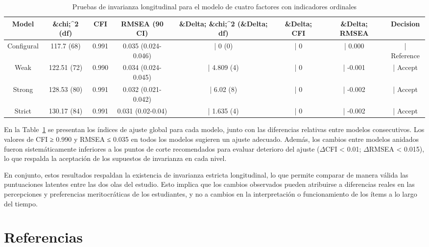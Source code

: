 \documentclass[
  12pt,
]{article}
\begin{document}
\begin{longtable}[t]{cccccccc}

\caption{\label{tbl-invarianza}Pruebas de invarianza longitudinal para
el modelo de cuatro factores con indicadores ordinales}

\tabularnewline

\toprule
Model & \&chi;\textasciicircum{}2 (df) & CFI & RMSEA (90 CI) & \&Delta; \&chi;\textasciicircum{}2 (\&Delta; df) & \&Delta; CFI & \&Delta; RMSEA & Decision\\
\midrule
Configural & 117.7 (68) & 0.991 & 0.035 
 (0.024-0.046) & |            0 (0) & |      0 & |     0.000 & | Reference\\
Weak & 122.51 (72) & 0.990 & 0.034 
 (0.024-0.045) & |          4.809 (4) & |      0 & |    -0.001 & |  Accept\\
Strong & 128.53 (80) & 0.991 & 0.032 
 (0.021-0.042) & |           6.02 (8) & |      0 & |    -0.002 & |  Accept\\
Strict & 130.17 (84) & 0.991 & 0.031 
 (0.02-0.04) & |          1.635 (4) & |      0 & |    -0.002 & |  Accept\\
\bottomrule

\end{longtable}

\endgroup{}

En la Table~\ref{tbl-invarianza} se presentan los índices de ajuste
global para cada modelo, junto con las diferencias relativas entre
modelos consecutivos. Los valores de CFI ≥ 0.990 y RMSEA ≤ 0.035 en
todos los modelos sugieren un ajuste adecuado. Además, los cambios entre
modelos anidados fueron sistemáticamente inferiores a los puntos de
corte recomendados para evaluar deterioro del ajuste (\(\Delta\)CFI
\textless{} 0.01; \(\Delta\)RMSEA \textless{} 0.015), lo que respalda la
aceptación de los supuestos de invarianza en cada nivel.

En conjunto, estos resultados respaldan la existencia de invarianza
estricta longitudinal, lo que permite comparar de manera válida las
puntuaciones latentes entre las dos olas del estudio. Esto implica que
los cambios observados pueden atribuirse a diferencias reales en las
percepciones y preferencias meritocráticas de los estudiantes, y no a
cambios en la interpretación o funcionamiento de los ítems a lo largo
del tiempo.

\section{Referencias}\label{referencias}
\end{document}
